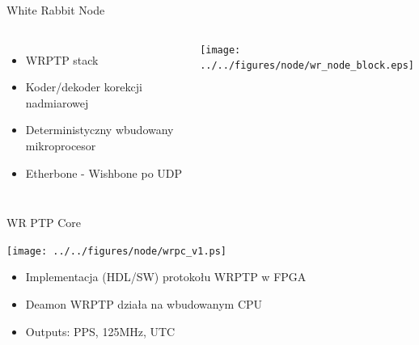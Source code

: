 \documentclass[compress,red]{beamer}
\begin{document}
\begin{frame}{White Rabbit Node}

  \begin{columns}[c]

  \begin{itemize}
    \item WRPTP stack
    \item Koder/dekoder korekcji nadmiarowej
    \item Deterministyczny wbudowany mikroprocesor
    \item Etherbone - Wishbone po UDP
  \end{itemize}



    \begin{center}
    \texttt{[image: ../../figures/node/wr\_node\_block.eps]}
    \end{center}


  \end{columns}



\end{frame}
\begin{frame}{WR PTP Core}





    \begin{center}
    \texttt{[image: ../../figures/node/wrpc\_v1.ps]}
    \end{center}

  \begin{itemize}
    \item Implementacja (HDL/SW) protokołu WRPTP w FPGA
    \item Deamon WRPTP działa na wbudowanym CPU
    \item Outputs: PPS, 125MHz, UTC
  \end{itemize}






\end{frame}
\end{document}
